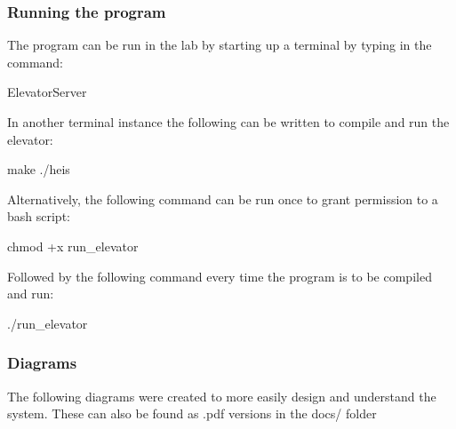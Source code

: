 \subsubsection*{Running the program}

The program can be run in the lab by starting up a terminal by typing in the command\+:


\begin{DoxyCode}
ElevatorServer
\end{DoxyCode}


In another terminal instance the following can be written to compile and run the elevator\+:


\begin{DoxyCode}
make
./heis
\end{DoxyCode}


Alternatively, the following command can be run once to grant permission to a bash script\+:


\begin{DoxyCode}
chmod +x run\_elevator
\end{DoxyCode}


Followed by the following command every time the program is to be compiled and run\+:


\begin{DoxyCode}
./run\_elevator
\end{DoxyCode}
 



\subsubsection*{Diagrams}

The following diagrams were created to more easily design and understand the system. These can also be found as {\ttfamily .pdf} versions in the {\ttfamily docs/} folder





 